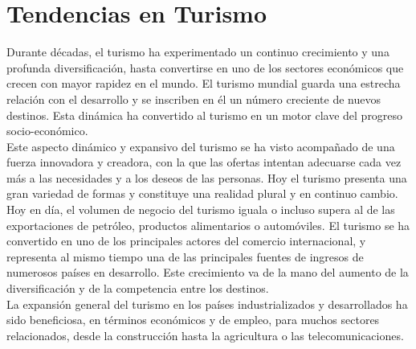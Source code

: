 \section{Tendencias en Turismo}

Durante décadas, el turismo ha experimentado un continuo crecimiento y una profunda diversificación, hasta convertirse en uno de los sectores económicos que crecen con mayor rapidez en el mundo. El turismo mundial guarda una estrecha relación con el desarrollo y se inscriben en él un número creciente de nuevos destinos. Esta dinámica ha convertido al turismo en un motor clave del progreso socio-económico. \\

Este aspecto dinámico y expansivo del turismo se ha visto acompañado de una fuerza innovadora y creadora, con la que las ofertas intentan adecuarse cada vez más a las necesidades y a los deseos de las personas. Hoy el turismo presenta una gran variedad de formas y constituye una realidad plural y en continuo cambio.\\

Hoy en día, el volumen de negocio del turismo iguala o incluso supera al de las exportaciones de petróleo, productos alimentarios o automóviles. El turismo se ha convertido en uno de los principales actores del comercio internacional, y representa al mismo tiempo una de las principales fuentes de ingresos de numerosos países en desarrollo. Este crecimiento va de la mano del aumento de la diversificación y de la competencia entre los destinos.\\

La expansión general del turismo en los países industrializados y desarrollados ha sido beneficiosa, en términos económicos y de empleo, para muchos sectores relacionados, desde la construcción hasta la agricultura o las telecomunicaciones.